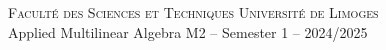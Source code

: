 \documentclass[11pt,a4paper]{article}
\begin{document}
\thispagestyle{empty}
\begin{center}

  \textsc{Facult\'e des Sciences et Techniques}  \hfill \textsc{Universit\'e de Limoges} \\
  Applied Multilinear Algebra \hfill M2 -- Semester 1 -- 2024/2025 \\
  \bigskip

\end{center}



\end{document}
